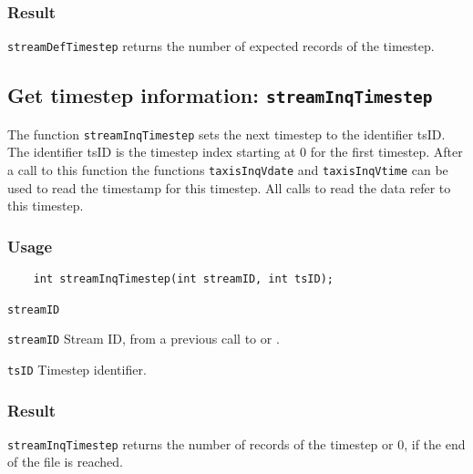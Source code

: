 \subsubsection*{Result}

{\texttt{streamDefTimestep}} returns the number of expected records of the timestep.



\subsection{Get timestep information: \texttt{streamInqTimestep}}
\label{streamInqTimestep}

The function {\texttt{streamInqTimestep}} sets the next timestep to the identifier tsID.
The identifier tsID is the timestep index starting at 0 for the first timestep.
After a call to this function the functions {\texttt{taxisInqVdate}} and {\texttt{taxisInqVtime}} can be used
to read the timestamp for this timestep. All calls to read the data refer to this timestep.

\subsubsection*{Usage}

\begin{verbatim}
    int streamInqTimestep(int streamID, int tsID);
\end{verbatim}

\hspace*{4mm}\begin{minipage}[]{15cm}
\begin{deflist}{\texttt{streamID}\ }
\item[\texttt{streamID}]
Stream ID, from a previous call to {} or {}.
\item[\texttt{tsID}]
Timestep identifier.

\end{deflist}
\end{minipage}

\subsubsection*{Result}

{\texttt{streamInqTimestep}} returns the number of records of the timestep or 0, if the end of the file is reached.

